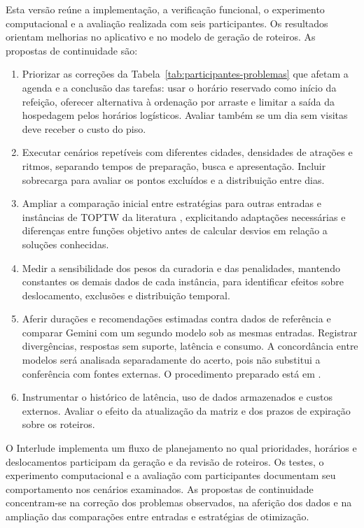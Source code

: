 Esta versão reúne a implementação, a verificação funcional, o experimento computacional e a avaliação realizada com seis participantes. Os resultados orientam melhorias no aplicativo e no modelo de geração de roteiros. As propostas de continuidade são:
\begin{enumerate}
  \item Priorizar as correções da Tabela~\ref{tab:participantes-problemas} que afetam a agenda e a conclusão das tarefas: usar o horário reservado como início da refeição, oferecer alternativa à ordenação por arraste e limitar a saída da hospedagem pelos horários logísticos. Avaliar também se um dia sem visitas deve receber o custo do piso.
  \item Executar cenários repetíveis com diferentes cidades, densidades de atrações e ritmos, separando tempos de preparação, busca e apresentação. Incluir sobrecarga para avaliar os pontos excluídos e a distribuição entre dias.
  \item Ampliar a comparação inicial entre estratégias para outras entradas e instâncias de TOPTW da literatura \cite{vansteenwegen2011survey}, explicitando adaptações necessárias e diferenças entre funções objetivo antes de calcular desvios em relação a soluções conhecidas.
  \item Medir a sensibilidade dos pesos da curadoria e das penalidades, mantendo constantes os demais dados de cada instância, para identificar efeitos sobre deslocamento, exclusões e distribuição temporal.
  \item Aferir durações e recomendações estimadas contra dados de referência e comparar Gemini com um segundo modelo sob as mesmas entradas. Registrar divergências, respostas sem suporte, latência e consumo. A concordância entre modelos será analisada separadamente do acerto, pois não substitui a conferência com fontes externas. O procedimento preparado está em .
  \item Instrumentar o histórico de latência, uso de dados armazenados e custos externos. Avaliar o efeito da atualização da matriz e dos prazos de expiração sobre os roteiros.
\end{enumerate}

O Interlude implementa um fluxo de planejamento no qual prioridades, horários e deslocamentos participam da geração e da revisão de roteiros. Os testes, o experimento computacional e a avaliação com participantes documentam seu comportamento nos cenários examinados. As propostas de continuidade concentram-se na correção dos problemas observados, na aferição dos dados e na ampliação das comparações entre entradas e estratégias de otimização.
